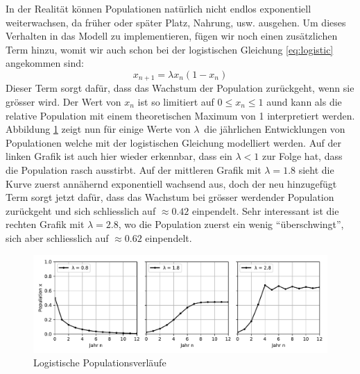 In der Realität können Populationen natürlich nicht endlos
exponentiell weiterwachsen, 
da früher oder später Platz, Nahrung, usw. ausgehen.
Um dieses Verhalten in das Modell zu implementieren,
fügen wir noch einen zusätzlichen Term hinzu, 
womit wir auch schon bei der logistischen Gleichung 
\ref{eq:logistic}
angekommen sind:
\begin{equation}
    \label{eq:logistic}
    x_{n+1} = \lambda x_{n} (1 - x_{n})
\end{equation}
Dieser Term sorgt dafür, 
dass das Wachstum der Population zurückgeht, 
wenn sie grösser wird.
Der Wert von $x_n$ ist so limitiert auf 
$0 \le x_n \le 1$  
aund kann als die relative Population mit einem
theoretischen Maximum von 1 interpretiert werden. 
Abbildung \ref{fig:pop_logistic} zeigt nun
für einige Werte von $\lambda$\
die jährlichen Entwicklungen von Populationen 
welche mit der logistischen Gleichung modelliert werden.
Auf der linken Grafik ist auch hier wieder erkennbar, 
dass ein $\lambda < 1$ zur Folge hat, 
dass die Population rasch ausstirbt. 
Auf der mittleren Grafik mit $\lambda = 1.8$ sieht 
die Kurve zuerst annähernd exponentiell wachsend aus,
doch der neu hinzugefügt Term sorgt jetzt dafür, 
dass das Wachstum bei grösser werdender Population zurückgeht 
und sich schliesslich auf $\approx 0.42$ einpendelt. 
Sehr interessant ist die rechten Grafik mit $\lambda = 2.8$,
wo die Population zuerst ein wenig ``überschwingt'', 
sich aber schliesslich auf $\approx 0.62$ einpendelt.  
\begin{figure}
    \includegraphics[width=\linewidth]{papers/logistic/figures/pop_logistic.pdf}
    \caption{Logistische Populationsverläufe}
    \label{fig:pop_logistic}
\end{figure}